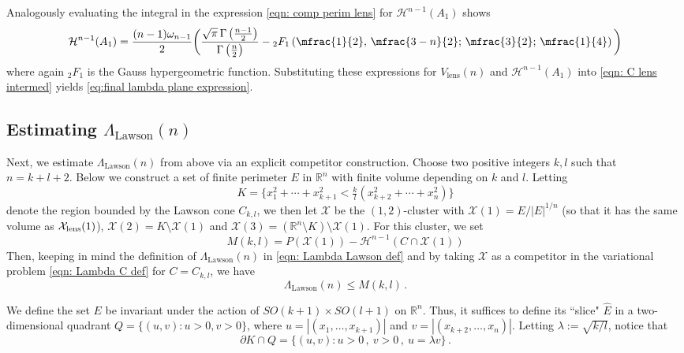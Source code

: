 \documentclass[10pt,reqno]{amsart}
\numberwithin{equation}{section}
\theoremstyle{definition}
\newcommand{\R}{\mathbb{R}}
\DeclareMathOperator{\Lawson}{Lawson}
\DeclareMathOperator{\lens}{lens}
\newcommand{\X}{\mathcal{X}}
\begin{document}
{{Analogously evaluating the integral in the expression \eqref{eqn: comp perim lens} for $\mathcal{H}^{n-1}(A_1)$ shows 
\[
\mathcal{H}^{n-1}(A_1) = 
\frac{(n-1)\omega_{n-1} }{2}\bigg(\frac{\sqrt{\pi}\, \Gamma\left(\frac{n-1}{2}\right)}{\Gamma\left(\frac{n}{2}\right)} - {}_2F_1\left(\mfrac{1}{2},\, \mfrac{3-{n}}{2} ; \, \mfrac{3}{2} ;  \,\mfrac{1}{4}\right)\bigg)
\]
where again ${}_2F_1$ is the Gauss hypergeometric function. Substituting these expressions for $V_{\lens}(n)$ and $\mathcal{H}^{n-1}(A_1)$ into \eqref{eqn: C lens intermed} yields \eqref{eq:final lambda plane expression}.


%
%
%
%

\subsection{Estimating $\Lambda_{\Lawson}(n)$}
\label{ss:Simons}
Next, we estimate $\Lambda_{\Lawson}(n)$ from above via an explicit competitor construction. 
Choose two positive integers $k,l$ such that $n= k+l+2.$ 
Below we construct a set of finite perimeter $E$  in $\R^n$ with finite volume depending on $k$ and $l$.
Letting 
\[
    K = \{x_1^2 + \cdots + x_{k+1}^2 < \tfrac{k}{l}(x_{k+2}^2 + \cdots + x_n^2)\}
\]
denote the region bounded by the Lawson cone $C_{k,l}$, we then let $\X$ be the $(1,2)$-cluster with $\X(1) = E /|E|^{1/n}$ (so that it has the same volume as $\X_{\rm lens}(1)$), $\X(2) = K \setminus \X(1)$ and $\X(3) = (\R^n\setminus K)\setminus \X(1)$. 
For this cluster, we set
\begin{equation}
    \label{eqn: def M k l}
M(k,l) = P(\X(1)) - \mathcal{H}^{n-1}(C\cap \X(1))
\end{equation}
Then, keeping in mind the definition of  $\Lambda_{\Lawson}(n)$ in \eqref{eqn: Lambda Lawson def} and  by taking $\X$ as a competitor in the variational problem \eqref{eqn: Lambda C def} for $C= C_{k,l}$, we have 
\begin{equation}
    \label{eqn: Lambda Lawson leq M}
\Lambda_{\Lawson}(n) \leq M(k,l)\,.
\end{equation}

We define the set $E$ be invariant under the action of $SO(k+1)\times SO(l+1)$ on $\R^n$. Thus,  it suffices to define its ``slice" $\hat{E}$ in a two-dimensional quadrant $Q =\{ (u,v) : u>0, v>0\}$, where $u=|(x_1,\dots,x_{k+1})|$ and $v= |(x_{k+2},\dots,x_n)|$.  Letting $\lambda:= \sqrt{{k}/{l}}$, notice that 
\[
    \partial K \cap Q = \{(u,v): u>0\,, \ v>0\,, \ u = \lambda v\}\,.
\]


}}
\end{document}
